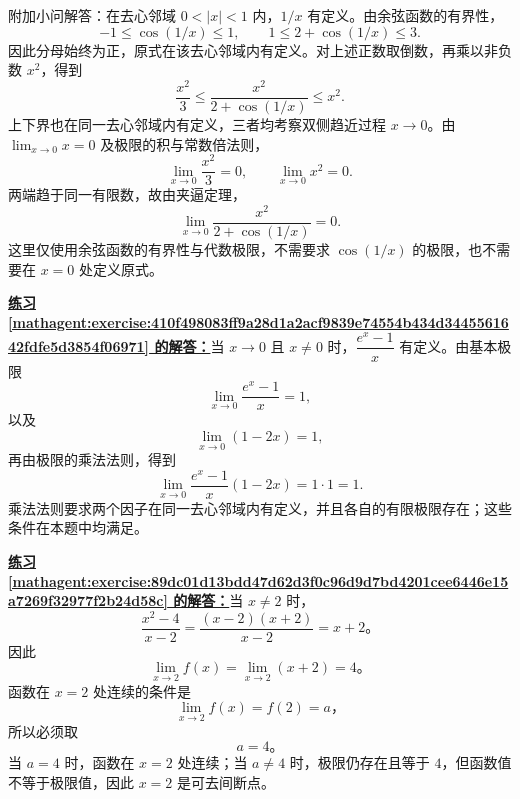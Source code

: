 \documentclass[UTF8,fontset=fandol,11pt]{ctexart}
\begin{document}
附加小问解答：在去心邻域 $0<|x|<1$ 内，$1/x$ 有定义。由余弦函数的有界性，
\[
-1\leq\cos(1/x)\leq1,
\qquad
1\leq2+\cos(1/x)\leq3.
\]
因此分母始终为正，原式在该去心邻域内有定义。对上述正数取倒数，再乘以非负数 $x^2$，得到
\[
\frac{x^2}{3}\leq\frac{x^2}{2+\cos(1/x)}\leq x^2.
\]
上下界也在同一去心邻域内有定义，三者均考察双侧趋近过程 $x\to0$。由 $\lim_{x\to0}x=0$ 及极限的积与常数倍法则，
\[
\lim_{x\to0}\frac{x^2}{3}=0,
\qquad
\lim_{x\to0}x^2=0.
\]
两端趋于同一有限数，故由夹逼定理，
\[
\lim_{x\to0}\frac{x^2}{2+\cos(1/x)}=0.
\]
这里仅使用余弦函数的有界性与代数极限，不需要求 $\cos(1/x)$ 的极限，也不需要在 $x=0$ 处定义原式。\par
\par\noindent\textbf{\hyperref[mathagent:exercise:410f498083ff9a28d1a2acf9839e74554b434d3445561642fdfe5d3854f06971]{练习 \ref*{mathagent:exercise:410f498083ff9a28d1a2acf9839e74554b434d3445561642fdfe5d3854f06971} 的解答：}}当 $x\to0$ 且 $x\neq0$ 时，$\dfrac{e^x-1}{x}$ 有定义。由基本极限
\[
\lim_{x\to0}\frac{e^x-1}{x}=1,
\]
以及
\[
\lim_{x\to0}(1-2x)=1,
\]
再由极限的乘法法则，得到
\[
\lim_{x\to0}\frac{e^x-1}{x}(1-2x)=1\cdot1=1.
\]
乘法法则要求两个因子在同一去心邻域内有定义，并且各自的有限极限存在；这些条件在本题中均满足。\par
\par\noindent\textbf{\hyperref[mathagent:exercise:89dc01d13bdd47d62d3f0c96d9d7bd4201cee6446e15a7269f32977f2b24d58c]{练习 \ref*{mathagent:exercise:89dc01d13bdd47d62d3f0c96d9d7bd4201cee6446e15a7269f32977f2b24d58c} 的解答：}}当 $x\neq2$ 时，
\[
\frac{x^2-4}{x-2}=\frac{(x-2)(x+2)}{x-2}=x+2\text{。}
\]
因此
\[
\lim_{x\to2}f(x)=\lim_{x\to2}(x+2)=4\text{。}
\]
函数在 $x=2$ 处连续的条件是
\[
\lim_{x\to2}f(x)=f(2)=a\text{，}
\]
所以必须取
\[
a=4\text{。}
\]
当 $a=4$ 时，函数在 $x=2$ 处连续；当 $a\neq4$ 时，极限仍存在且等于 $4$，但函数值不等于极限值，因此 $x=2$ 是可去间断点。\par
\end{document}
